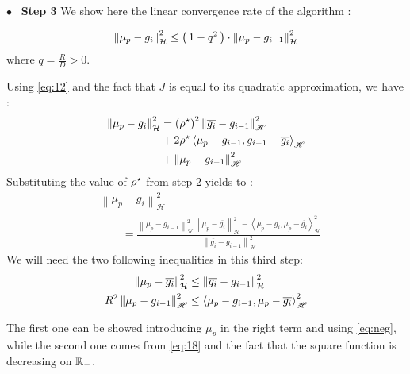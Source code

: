  {$\bullet$~\normalfont\bfseries\color{myorange!90!black} Step 3 } We show here
 the linear convergence rate of the algorithm :
 \begin{boxtheorem}
\begin{equation}
  \norme{\mu_p-g_i}^2 \leq \prt{1-q^2}\cdot \norme{\mu_p-g_{i-1}}^2
\end{equation}
where $q = \frac{R}{D}>0$.
 \end{boxtheorem}

 \begin{boxcomputation}
Using \eqref{eq:12} and the fact that $J$ is equal to its quadratic approximation, we have :
\begin{align*}
  \norme{\mu_p-g_i}^2
  &= \left( \ropt \right) ^ { 2 } \left\| \overline{g_i}-g_{i-1} \right\|_{ \mathscr { H }} ^ { 2 } \\&+ 2 \ropt \left\langle \mu_p-g_{i-1} , g_{i-1}-\overline{g_i} \right\rangle_{ \mathscr { H }} \\&+ \left\| \mu_p-g_{i-1} \right\|_{ \mathscr { H }} ^ { 2 }
\end{align*}
Substituting the value of $\ropt$ from step 2 yields to :
\begin{align*}
&\left\| \mu_p-g_i \right\|_{ \mathscr { H }} ^ { 2 } \\ &\qquad= \frac { \left\| \mu_p-g_{i-1} \right\|_{ \mathscr { H }} ^ { 2 } \left\| \mu_p-\overline{g_i} \right\|_{ \mathscr { H }} ^ { 2 } - \left\langle \mu_p-g_i , \mu_p-\overline{g_i} \right\rangle_{ \mathscr { H }} ^ { 2 } } { \left\| \overline{g_i}-g_{i-1} \right\|_{ \mathscr { H }} ^ { 2 } }
\end{align*}
We will need the two following inequalities in this third step:
\begin{align}
  \norme{\mu_p-\overline{g_i}}^2 &\leq \norme{\overline{g_i}-g_{i-1}}^2\\
  R^2 \left\| \mu _ { p } - g _ { i - 1 } \right\| _ { \mathscr { H } }^2 &\leq
  \left\langle \mu _ { p } - g _ { i - 1 } , \mu _ { p } - \overline { g _ { i } } \right\rangle _ { \mathscr { H } }^2
\end{align}

The first one can be showed introducing $\mu_p$ in the right term and using
 \eqref{eq:neg}, while the second one comes from \eqref{eq:18} and the fact that
 the square function is decreasing on $\mathbb{R}_{-}$.


\end{boxcomputation}
